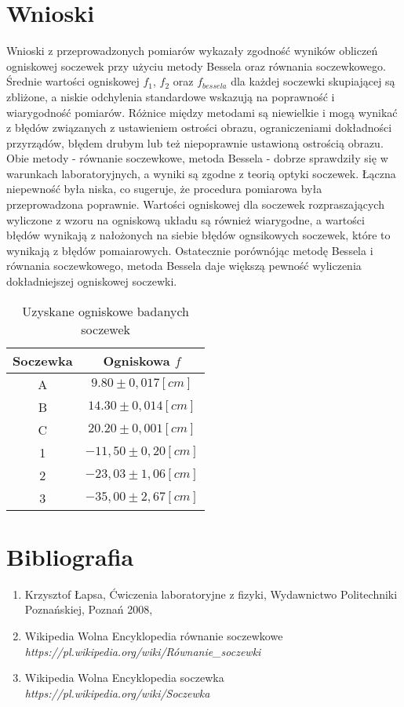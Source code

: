 \documentclass{article}
\begin{document}
\FloatBarrier

\section*{Wnioski}
Wnioski z przeprowadzonych pomiarów wykazały zgodność wyników obliczeń ogniskowej soczewek przy użyciu metody Bessela oraz równania soczewkowego. Średnie wartości ogniskowej $f_1$, $f_2$ oraz $f_{bessela}$ dla każdej soczewki skupiającej są zbliżone, a niskie odchylenia standardowe wskazują na poprawność i wiarygodność pomiarów. Różnice między metodami są niewielkie i mogą wynikać z błędów związanych z ustawieniem ostrości obrazu, ograniczeniami dokładności przyrządów, błędem drubym lub też niepoprawnie ustawioną ostrością obrazu. Obie metody - równanie soczewkowe, metoda Bessela - dobrze sprawdziły się w warunkach laboratoryjnych, a wyniki są zgodne z teorią optyki soczewek. Łączna niepewność była niska, co sugeruje, że procedura pomiarowa była przeprowadzona poprawnie. Wartości ogniskowej dla soczewek rozpraszających wyliczone z wzoru na ogniskową układu są również wiarygodne, a wartości błędów wynikają z nałożonych na siebie błędów ognsikowych soczewek, które to wynikają z błędów pomaiarowych. Ostatecznie porównójąc metodę Bessela i równania soczewkowego, metoda Bessela daje większą pewność wyliczenia dokładniejszej ogniskowej soczewki. 

\begin{table}[!ht]
    \centering
    \begin{tabular}{c|c}
        Soczewka & Ogniskowa $f$\\ \hline
         A & $9.80 \pm 0,017[cm]$\\ \hline
         B & $14.30 \pm 0,014[cm]$  \\ \hline
         C & $20.20 \pm 0,001[cm]$\\ \hline
         1 & $-11,50 \pm 0,20[cm]$ \\ \hline
         2 & $-23,03 \pm 1,06[cm]$ \\ \hline
         3 &  $-35,00 \pm 2,67[cm]$ \\
    \end{tabular}
    \caption{Uzyskane ogniskowe badanych soczewek }
    \label{tab:wynik}
\end{table}

\FloatBarrier

\section*{Bibliografia}
\begin{enumerate}
    \item Krzysztof Łapsa, Ćwiczenia laboratoryjne z fizyki, Wydawnictwo Politechniki Poznańskiej, Poznań 2008,
    \item Wikipedia Wolna Encyklopedia równanie soczewkowe \textit{https://pl.wikipedia.org/wiki/Równanie\_soczewki}
    \item Wikipedia Wolna Encyklopedia soczewka \textit{https://pl.wikipedia.org/wiki/Soczewka}
\end{enumerate}
\end{document}
